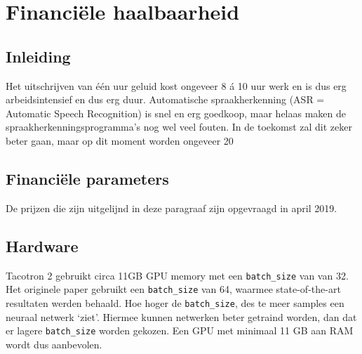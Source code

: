 \chapter{Financiële haalbaarheid}

\begin{center}
  \begin{minipage}{0.5\textwidth}
    \begin{small}
    \end{small}
  \end{minipage}
  \vspace{0.5cm}
\end{center}

\section{Inleiding}

Het uitschrijven van één uur geluid kost ongeveer 8 á 10 uur werk en is dus erg arbeidsintensief en dus erg duur. Automatische spraakherkenning (ASR = Automatic Speech Recognition) is snel en erg goedkoop, maar helaas maken de spraakherkenningsprogramma’s nog wel veel fouten. In de toekomst zal dit zeker beter gaan, maar op dit moment worden ongeveer 20%

\section{Financiële parameters}
De prijzen die zijn uitgelijnd in deze paragraaf zijn opgevraagd in april 2019.


\section{Hardware}

Tacotron 2 gebruikt circa 11GB GPU memory met een \texttt{batch\_size} van van 32. Het originele paper gebruikt een \texttt{batch\_size} van 64, waarmee state-of-the-art resultaten werden behaald. Hoe hoger de \texttt{batch\_size}, des te meer samples een neuraal netwerk `ziet'. Hiermee kunnen netwerken beter getraind worden, dan dat er lagere \texttt{batch\_size} worden gekozen.  Een GPU met minimaal 11 GB aan RAM wordt dus aanbevolen.

